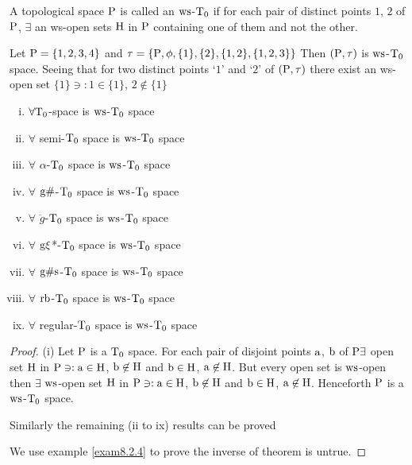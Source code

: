 \begin{dfn}\label{defi8.2.1}
A topological space $\mathrm{P}$ is called an $\mathrm{ws}$-$\mathrm{T}_{0}$ if for each pair of distinct points $1$, $2$ of $\mathrm{P}$, $\exists$ an ws-open sets $\mathrm{H}$ in $\mathrm{P}$ containing one of them and not the other.
\end{dfn}

\begin{exm}\label{exam8.2.2}
Let $\mathrm{P}= \{1, 2, 3, 4\}$ and $\tau =\{\mathrm{P}, \phi, \{1\},\{2\},\{1,2\},\{1,2,3\}\}$ Then $(\mathrm{P}, \tau)$ is $\mathrm{ws}$-$\mathrm{T}_{0}$ space. Seeing that for two distinct points `$1$' and `$2$' of $(\mathrm{P}, \tau)$ there exist an ws-open set $\{1\} \ni: 1 \in \{1\}$, $2 \not\in \{1\}$
\end{exm}

\begin{thm}\label{thm8.2.3}
\begin{enumerate}[(i)]
\item $\forall \mathrm{T}_{0}$-space is $\mathrm{ws}$-$\mathrm{T}_{0}$ space
\item $\forall$ semi-$\mathrm{T}_{0}$ space is $\mathrm{ws}$-$\mathrm{T}_{0}$ space
\item $\forall$ $\alpha$-$\mathrm{T}_{0}$ space is $\mathrm{ws}$-$\mathrm{T}_{0}$ space
\item $\forall$ $\mathrm{g}\#$-$\mathrm{T}_{0}$ space is $\mathrm{ws}$-$\mathrm{T}_{0}$ space
\item $\forall$ $\ddot{g}$-$\mathrm{T}_{0}$ space is $\mathrm{ws}$-$\mathrm{T}_{0}$ space
\item $\forall$ $\mathrm{g}\xi$*-$\mathrm{T}_{0}$ space is $\mathrm{ws}$-$\mathrm{T}_{0}$ space
\item $\forall$ $\mathrm{g}\#\mathrm{s}$-$\mathrm{T}_{0}$ space is $\mathrm{ws}$-$\mathrm{T}_{0}$ space
\item $\forall$ $\mathrm{rb}$-$\mathrm{T}_{0}$ space is $\mathrm{ws}$-$\mathrm{T}_{0}$ space
\item $\forall$ regular-$\mathrm{T}_{0}$ space is $\mathrm{ws}$-$\mathrm{T}_{0}$ space
\end{enumerate}
\end{thm}

\begin{proof}
(i) Let $\mathrm{P}$ is a $\mathrm{T}_{0}$ space. For each pair of disjoint points $\mathrm{a}$, $\mathrm{b}$ of $\mathrm{P} \exists$ open set $\mathrm{H}$ in $\mathrm{P} \ni: \mathrm{a} \in \mathrm{H}$, $\mathrm{b} \not\in \mathrm{H}$ and $\mathrm{b} \in \mathrm{H}$, $\mathrm{a} \not\in \mathrm{H}$. But every open set is $\mathrm{ws}$-open then $\exists$ $\mathrm{ws}$-open set $\mathrm{H}$ in $\mathrm{P} \ni: \mathrm{a} \in \mathrm{H}$, $\mathrm{b} \not\in \mathrm{H}$ and $\mathrm{b}\in \mathrm{H}$, $\mathrm{a} \not\in \mathrm{H}$. Henceforth $\mathrm{P}$ is a $\mathrm{ws}$-$\mathrm{T}_{0}$ space.

Similarly the remaining (ii to ix) results can be proved

We use example \ref{exam8.2.4} to prove the inverse of theorem is untrue.
\end{proof}

